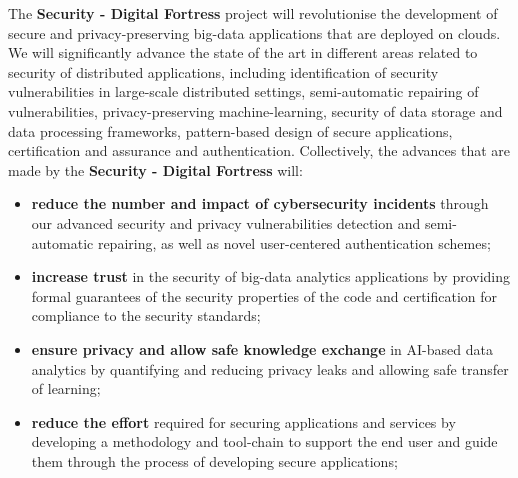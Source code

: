 \documentclass[a4paper,11pt]{article}
\newcommand{\project}[1]{\textbf{#1}\xspace}
\newcommand{\SECURITY}{\project{Security - Digital Fortress}}
\newcommand{\TheProject}{\SECURITY}
\begin{document}





The \TheProject{} project will revolutionise the development of secure and privacy-preserving big-data applications that are deployed on clouds. We will significantly advance the state of the art in different areas related to security of distributed applications, including identification of security vulnerabilities in large-scale distributed settings, semi-automatic repairing of vulnerabilities, privacy-preserving machine-learning, security of data storage and data processing frameworks, pattern-based design of secure applications, certification and assurance and authentication. Collectively, the advances that are made by the \TheProject{} will:
\begin{itemize}
\item \textbf{reduce the number and impact of cybersecurity incidents} through our advanced security and privacy vulnerabilities detection and semi-automatic repairing, as well as novel user-centered authentication schemes;
\item \textbf{increase trust} in the security of big-data analytics applications by providing formal guarantees of the security properties of the code and certification for compliance to the security standards;
\item \textbf{ensure privacy and allow safe knowledge exchange} in AI-based data analytics by quantifying and reducing privacy leaks and allowing safe transfer of learning;
\item \textbf{reduce the effort} required for securing applications and services by developing a methodology and tool-chain to support the end user and guide them through the process of developing secure applications;

\end{itemize}
\end{document}
